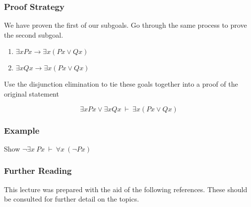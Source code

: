 \documentclass{beamer}
\theoremstyle{indentDefn} \newtheorem{defn}[]{Definition}
\begin{document}
\begin{frame}
	\frametitle{Proof Strategy}
	
	We have proven the first of our subgoals. Go through the same process to prove the second subgoal. 
	
	\begin{center}
		\begin{enumerate}
			\item $\exists x Px \rightarrow \exists x (Px \lor Qx)$
			\item $\exists x Qx \rightarrow \exists x (Px \lor Qx)$		
		\end{enumerate}
	\end{center}	
	
	Use the disjunction elimination to tie these goals together into a proof of the original statement
	
	$$\exists x Px \lor \exists x Qx \ \vdash \ \exists x (Px \lor Qx)$$
	
	\vspace{2cm}
	
	
\end{frame}

\begin{frame}
	\frametitle{Example}

	Show $\lnot \exists x \ Px \ \vdash \ \forall x \ (\lnot Px)$

	\vspace{6cm}

\end{frame}

\begin{frame}
	\frametitle{Further Reading}
	
    This lecture was prepared with the aid of the following references. These should be consulted for further detail on the topics. 

    \printbibliography
	
\end{frame}
\end{document}
